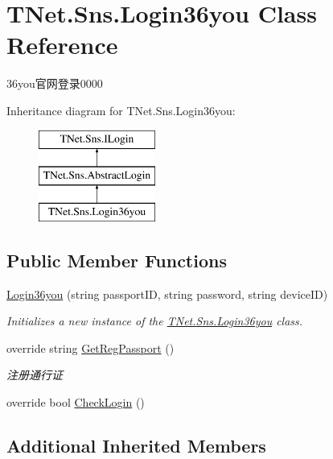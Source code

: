 \hypertarget{class_t_net_1_1_sns_1_1_login36you}{}\section{T\+Net.\+Sns.\+Login36you Class Reference}
\label{class_t_net_1_1_sns_1_1_login36you}


36you官网登录0000  


Inheritance diagram for T\+Net.\+Sns.\+Login36you\+:\begin{figure}[H]
\begin{center}
\leavevmode
\includegraphics[height=3.000000cm]{class_t_net_1_1_sns_1_1_login36you}
\end{center}
\end{figure}
\subsection*{Public Member Functions}
\begin{DoxyCompactItemize}
\item 
\mbox{\hyperlink{class_t_net_1_1_sns_1_1_login36you_aee128c7c9bfeba370442d192a8901c6e}{Login36you}} (string passport\+ID, string password, string device\+ID)
\begin{DoxyCompactList}\small\item\em Initializes a new instance of the \mbox{\hyperlink{class_t_net_1_1_sns_1_1_login36you}{T\+Net.\+Sns.\+Login36you}} class. \end{DoxyCompactList}\item 
override string \mbox{\hyperlink{class_t_net_1_1_sns_1_1_login36you_a01060a26e8212aaac7e29b634263001a}{Get\+Reg\+Passport}} ()
\begin{DoxyCompactList}\small\item\em 注册通行证 \end{DoxyCompactList}\item 
override bool \mbox{\hyperlink{class_t_net_1_1_sns_1_1_login36you_a87ec454ab2e41a350763b10827f1b179}{Check\+Login}} ()
\end{DoxyCompactItemize}
\subsection*{Additional Inherited Members}


